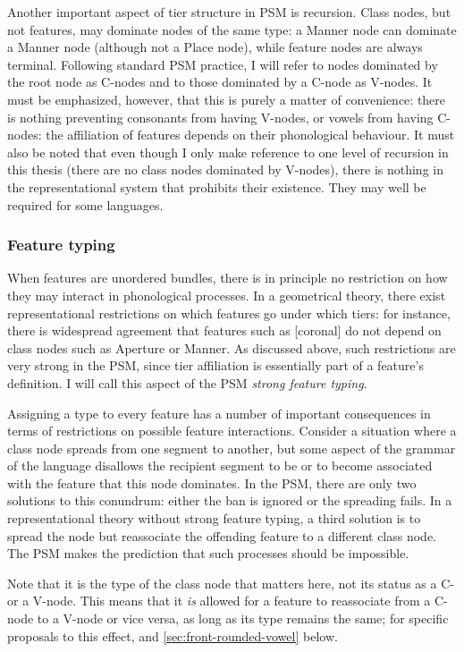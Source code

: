 Another important aspect of tier structure in PSM is recursion. Class nodes, but not features, may dominate nodes of the same type: \ie a Manner node can dominate a Manner node (although not a Place node), while feature nodes are always terminal. Following standard PSM practice, I will refer to nodes dominated by the root node as C-nodes and to those dominated by a C-node as V-nodes. It must be emphasized, however, that this is purely a matter of convenience: there is nothing preventing consonants from having V-nodes, or vowels from having C-nodes: the affiliation of features depends on their phonological behaviour. It must also be noted that even though I only make reference to one level of recursion in this thesis (\ie there are no class nodes dominated by V-nodes), there is nothing in the representational system that prohibits their existence. They may well be required for some languages.

\subsubsection{Feature typing}
\label{sec:feature-typing}

When features are unordered bundles, there is in principle no restriction on how they may interact in phonological processes. In a geometrical theory, there exist representational restrictions on which features go under which tiers: for instance, there is widespread agreement that features such as [coronal] do not depend on class nodes such as Aperture or Manner. As discussed above, such restrictions are very strong in the PSM, since tier affiliation is essentially part of a feature's definition. I will call this aspect of the PSM \emph{strong feature typing}.

Assigning a type to every feature has a number of important consequences in terms of restrictions on possible feature interactions. Consider a situation where a class node spreads from one segment to another, but some aspect of the grammar of the language disallows the recipient segment to be or to become associated with the feature that this node dominates. In the PSM, there are only two solutions to this conundrum: either the ban is ignored or the spreading fails. In a representational theory without strong feature typing, a third solution is to spread the node but reassociate the offending feature to a different class node. The PSM makes the prediction that such processes should be impossible.

Note that it is the type of the class node that matters here, not its status as a C- or a V-node. This means that it \emph{is} allowed for a feature to reassociate from a C-node to a V-node or vice versa, as long as its type remains the same; for specific proposals to this effect, \cf \citet{clements91:_place,youssef11:_labial_baghd_arabic} and \cref{sec:front-rounded-vowel} below.

